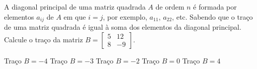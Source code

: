 A diagonal principal de uma matriz quadrada $A$ de ordem $n$ é formada por elementos $a_{ij}$ de $A$ em que $i=j$, por exemplo, $a_{11}$, $a_{22}$, etc. Sabendo que o traço de uma matriz quadrada é igual à soma dos elementos da diagonal principal. Calcule o traço da matriz $B = \left[ \begin{array}{cc}
5 & 12 \\
8 & -9
\end{array} \right]$.

Traço $B=-4$
Traço $B=-3$
Traço $B=-2$
Traço $B=0$
Traço $B=4$


